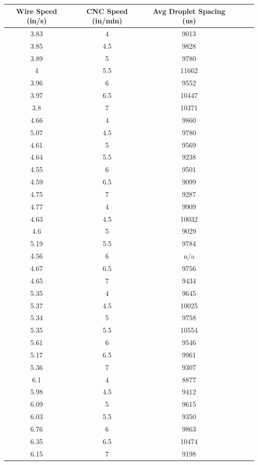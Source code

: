 \documentclass[12pt]{article}
\begin{document}
\clearpage


\begin{center}

\begin{tabular}{ |c|c|c|c|c|c| }


  \hline
  \textbf{Wire Speed (in/s)} & \textbf{CNC Speed (in/min)} & \textbf{Avg Droplet Spacing (us)} \\ \hline
3.83 &	4 &	9013 \\ \hline
3.85 &	4.5 &	9828 \\ \hline
3.89 &	5 &	9780 \\ \hline
4 &	5.5 &	11662 \\ \hline
3.96 &	6 &	9552 \\ \hline
3.97 &	6.5 &	10447 \\ \hline
3.8 &	7 &	10371 \\ \hline \hline
4.66 &	4 &	9860 \\ \hline
5.07 &	4.5 &	9780 \\ \hline
4.61 &	5 &	9569 \\ \hline
4.64 &	5.5 &	9238 \\ \hline
4.55 &	6 &	9501 \\ \hline
4.59 &	6.5 &	9099 \\ \hline
4.75 &	7 &	9287 \\ \hline \hline
4.77 &	4 &	9909 \\ \hline
4.63 &	4.5 &	10032 \\ \hline
4.6 &	5 &	9029 \\ \hline
5.19 &	5.5 &	9784 \\ \hline
4.56 &	6 &	n/a \\ \hline
4.67 &	6.5 &	9756 \\ \hline
4.65 &	7 &	9434 \\ \hline \hline
5.35 &	4 &	9645 \\ \hline
5.37 &	4.5 &	10025 \\ \hline
5.34 &	5 &	9758 \\ \hline
5.35 &	5.5 &	10554 \\ \hline
5.61 &	6 &	9546 \\ \hline
5.17 &	6.5 &	9961 \\ \hline
5.36 &	7 &	9307 \\ \hline \hline
6.1 &	4 &	8877 \\ \hline
5.98 &	4.5 &	9412 \\ \hline
6.09 &	5 &	9615 \\ \hline
6.03 &	5.5 &	9350 \\ \hline
6.76 &	6 &	9863 \\ \hline
6.35 &	6.5 &	10474 \\ \hline
6.15 &	7 &	9198 \\ \hline



 
\end{tabular}


\end{center}
\end{document}
